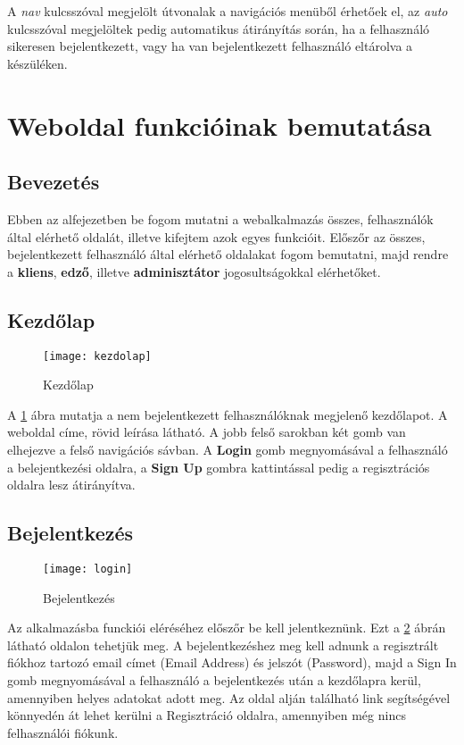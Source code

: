 A \textit{nav} kulcsszóval megjelölt útvonalak a navigációs menüből érhetőek el, az \textit{auto} kulcsszóval megjelöltek pedig automatikus átirányítás során, ha a felhasználó sikeresen bejelentkezett, vagy ha van bejelentkezett felhasználó eltárolva a készüléken.

\section{Weboldal funkcióinak bemutatása}

\subsection{Bevezetés}

Ebben az alfejezetben be fogom mutatni a webalkalmazás összes, felhasználók által elérhető oldalát, illetve kifejtem azok egyes funkcióit. Előszőr az összes, bejelentkezett felhasználó által elérhető oldalakat fogom bemutatni, majd rendre a \textbf{kliens}, \textbf{edző}, illetve \textbf{adminisztátor} jogosultságokkal elérhetőket.

\subsection{Kezdőlap}

\begin{figure}[H]
	\centering
	\texttt{[image: kezdolap]}
	\caption{Kezdőlap}
	\label{fig:kezdolap}
\end{figure}

A \ref{fig:kezdolap} ábra mutatja a nem bejelentkezett felhasználóknak megjelenő kezdőlapot. A weboldal címe, rövid leírása látható. A jobb felső sarokban két gomb van elhejezve a felső navigációs sávban. A \textbf{Login} gomb megnyomásával a felhasználó a belejentkezési oldalra, a \textbf{Sign Up} gombra kattintással pedig a regisztrációs oldalra lesz átirányítva.

\subsection{Bejelentkezés}

\begin{figure}[H]
	\centering
	\texttt{[image: login]}
	\caption{Bejelentkezés}
	\label{fig:login}
\end{figure}

Az alkalmazásba funckiói eléréséhez előszőr be kell jelentkeznünk. Ezt a \ref{fig:login} ábrán látható oldalon tehetjük meg. A bejelentkezéshez meg kell adnunk a regisztrált fiókhoz tartozó email címet (Email Address) és jelszót (Password), majd a Sign In gomb megnyomásával a felhasználó a bejelentkezés után a kezdőlapra kerül, amennyiben helyes adatokat adott meg. Az oldal alján található link segítségével könnyedén át lehet kerülni a Regisztráció oldalra, amennyiben még nincs felhasználói fiókunk.

